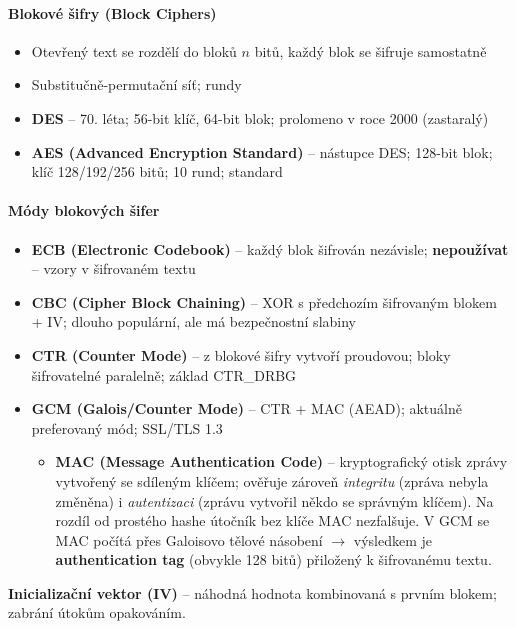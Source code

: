 \paragraph{Blokové šifry (Block Ciphers)}
\begin{itemize}
  \item Otevřený text se rozdělí do bloků $n$ bitů, každý blok se šifruje samostatně
  \item Substitučně-permutační síť; rundy
  \item \textbf{DES} -- 70. léta; 56-bit klíč, 64-bit blok; prolomeno v roce 2000 (zastaralý)
  \item \textbf{AES (Advanced Encryption Standard)} -- nástupce DES; 128-bit blok; klíč 128/192/256 bitů; 10 rund; standard
\end{itemize}

\paragraph{Módy blokových šifer}
\begin{itemize}
  \item \textbf{ECB (Electronic Codebook)} -- každý blok šifrován nezávisle; \textbf{nepoužívat} -- vzory v šifrovaném textu
  \item \textbf{CBC (Cipher Block Chaining)} -- XOR s předchozím šifrovaným blokem + IV; dlouho populární, ale má bezpečnostní slabiny
  \item \textbf{CTR (Counter Mode)} -- z blokové šifry vytvoří proudovou; bloky šifrovatelné paralelně; základ CTR\_DRBG
  \item \textbf{GCM (Galois/Counter Mode)} -- CTR + MAC (AEAD); aktuálně preferovaný mód; SSL/TLS 1.3
    \begin{itemize}
      \item \textbf{MAC (Message Authentication Code)} -- kryptografický otisk zprávy vytvořený
        se sdíleným klíčem; ověřuje zároveň \textit{integritu} (zpráva nebyla změněna)
        i \textit{autentizaci} (zprávu vytvořil někdo se správným klíčem).
        Na rozdíl od prostého hashe útočník bez klíče MAC nezfalšuje.
        V GCM se MAC počítá přes Galoisovo tělové násobení $\to$ výsledkem je
        \textbf{authentication tag} (obvykle 128 bitů) přiložený k šifrovanému textu.
    \end{itemize}
\end{itemize}

\textbf{Inicializační vektor (IV)} -- náhodná hodnota kombinovaná s prvním blokem; zabrání útokům opakováním.

